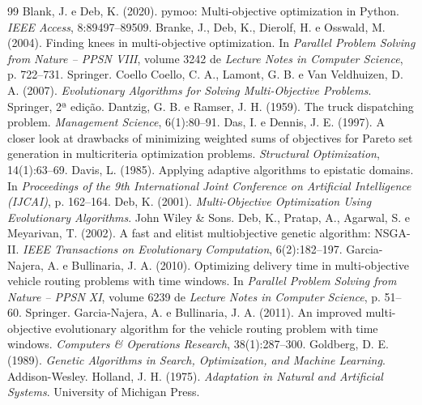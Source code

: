 \documentclass[a4paper,12pt]{article}
\begin{document}
\begin{thebibliography}{99}
Blank, J. e Deb, K. (2020). pymoo: Multi-objective optimization in Python. \emph{IEEE Access}, 8:89497--89509.
Branke, J., Deb, K., Dierolf, H. e Osswald, M. (2004). Finding knees in multi-objective optimization. In \emph{Parallel Problem Solving from Nature -- PPSN VIII}, volume 3242 de \emph{Lecture Notes in Computer Science}, p. 722--731. Springer.
Coello Coello, C. A., Lamont, G. B. e Van Veldhuizen, D. A. (2007). \emph{Evolutionary Algorithms for Solving Multi-Objective Problems}. Springer, 2ª edição.
Dantzig, G. B. e Ramser, J. H. (1959). The truck dispatching problem. \emph{Management Science}, 6(1):80--91.
Das, I. e Dennis, J. E. (1997). A closer look at drawbacks of minimizing weighted sums of objectives for Pareto set generation in multicriteria optimization problems. \emph{Structural Optimization}, 14(1):63--69.
Davis, L. (1985). Applying adaptive algorithms to epistatic domains. In \emph{Proceedings of the 9th International Joint Conference on Artificial Intelligence (IJCAI)}, p. 162--164.
Deb, K. (2001). \emph{Multi-Objective Optimization Using Evolutionary Algorithms}. John Wiley \& Sons.
Deb, K., Pratap, A., Agarwal, S. e Meyarivan, T. (2002). A fast and elitist multiobjective genetic algorithm: NSGA-II. \emph{IEEE Transactions on Evolutionary Computation}, 6(2):182--197.
Garcia-Najera, A. e Bullinaria, J. A. (2010). Optimizing delivery time in multi-objective vehicle routing problems with time windows. In \emph{Parallel Problem Solving from Nature -- PPSN XI}, volume 6239 de \emph{Lecture Notes in Computer Science}, p. 51--60. Springer.
Garcia-Najera, A. e Bullinaria, J. A. (2011). An improved multi-objective evolutionary algorithm for the vehicle routing problem with time windows. \emph{Computers \& Operations Research}, 38(1):287--300.
Goldberg, D. E. (1989). \emph{Genetic Algorithms in Search, Optimization, and Machine Learning}. Addison-Wesley.
Holland, J. H. (1975). \emph{Adaptation in Natural and Artificial Systems}. University of Michigan Press.

\end{thebibliography}
\end{document}
